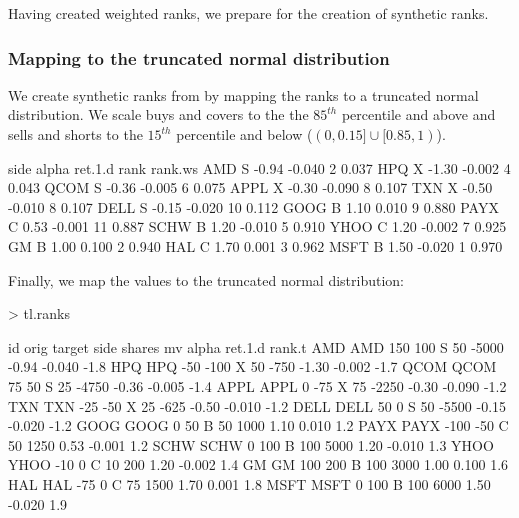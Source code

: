 \documentclass{article}
\begin{document}
Having created weighted ranks, we prepare for the creation of
synthetic ranks.

\subsubsection{Mapping to the truncated normal distribution}

We create synthetic ranks from by mapping the ranks to a truncated
normal distribution.  We scale buys and covers to the the $85^{th}$
percentile and above and sells and shorts to the $15^{th}$ percentile
and below ($(0, 0.15]\cup[0.85,1)$).

\begin{Schunk}
\begin{Soutput}
     side alpha ret.1.d rank rank.ws
AMD     S -0.94  -0.040    2   0.037
HPQ     X -1.30  -0.002    4   0.043
QCOM    S -0.36  -0.005    6   0.075
APPL    X -0.30  -0.090    8   0.107
TXN     X -0.50  -0.010    8   0.107
DELL    S -0.15  -0.020   10   0.112
GOOG    B  1.10   0.010    9   0.880
PAYX    C  0.53  -0.001   11   0.887
SCHW    B  1.20  -0.010    5   0.910
YHOO    C  1.20  -0.002    7   0.925
GM      B  1.00   0.100    2   0.940
HAL     C  1.70   0.001    3   0.962
MSFT    B  1.50  -0.020    1   0.970
\end{Soutput}
\end{Schunk}

Finally, we map the values to the truncated normal distribution:


\begin{Schunk}
\begin{Sinput}
> tl.ranks
\end{Sinput}
\begin{Soutput}
       id orig target side shares    mv alpha ret.1.d rank.t
AMD   AMD  150    100    S     50 -5000 -0.94  -0.040   -1.8
HPQ   HPQ  -50   -100    X     50  -750 -1.30  -0.002   -1.7
QCOM QCOM   75     50    S     25 -4750 -0.36  -0.005   -1.4
APPL APPL    0    -75    X     75 -2250 -0.30  -0.090   -1.2
TXN   TXN  -25    -50    X     25  -625 -0.50  -0.010   -1.2
DELL DELL   50      0    S     50 -5500 -0.15  -0.020   -1.2
GOOG GOOG    0     50    B     50  1000  1.10   0.010    1.2
PAYX PAYX -100    -50    C     50  1250  0.53  -0.001    1.2
SCHW SCHW    0    100    B    100  5000  1.20  -0.010    1.3
YHOO YHOO  -10      0    C     10   200  1.20  -0.002    1.4
GM     GM  100    200    B    100  3000  1.00   0.100    1.6
HAL   HAL  -75      0    C     75  1500  1.70   0.001    1.8
MSFT MSFT    0    100    B    100  6000  1.50  -0.020    1.9
\end{Soutput}
\end{Schunk}
\end{document}
